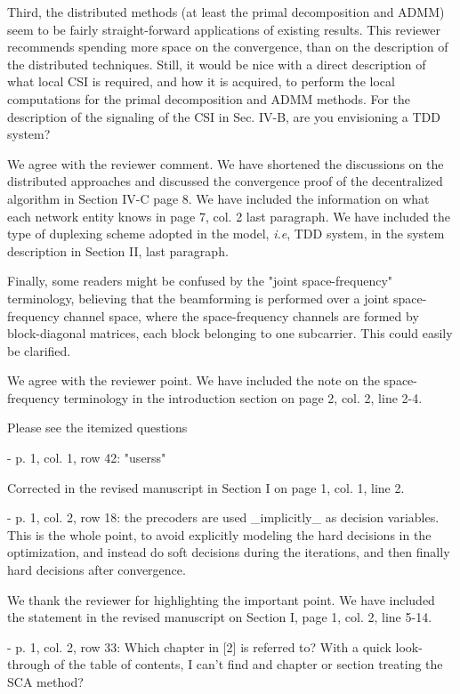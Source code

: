 \begin{itemize}
 Third, the distributed methods (at least the primal decomposition and ADMM) seem to be fairly straight-forward applications of existing results. This reviewer recommends spending more space on the convergence, than on the description of the distributed techniques. Still, it would be nice with a direct description of what local CSI is required, and how it is acquired, to perform the local computations for the primal decomposition and ADMM methods. For the description of the signaling of the CSI in Sec. IV-B, are you envisioning a TDD system?

\resp We agree with the reviewer comment. We have shortened the discussions on the distributed approaches and discussed the convergence proof of the decentralized algorithm in Section IV-C page 8. We have included the information on what each network entity knows in page 7, col. 2 last paragraph. We have included the type of duplexing scheme adopted in the model, \textit{i.e}, TDD system, in the system description in Section II, last paragraph.

 Finally, some readers might be confused by the "joint space-frequency" terminology, believing that the beamforming is performed over a joint space-frequency channel space, where the space-frequency channels are formed by block-diagonal matrices, each block belonging to one subcarrier. This could easily be clarified. 

\resp We agree with the reviewer point. We have included the note on the space-frequency terminology in the introduction section on page 2, col. 2, line 2-4.

 Please see the itemized questions

\begin{itemize}

 - p. 1, col. 1, row 42: "userss"

\resp Corrected in the revised manuscript in Section I on page 1, col. 1, line 2.

 - p. 1, col. 2, row 18: the precoders are used \_implicitly\_ as decision variables. This is the whole point, to avoid explicitly modeling the hard decisions in the optimization, and instead do soft decisions during the iterations, and then finally hard decisions after convergence.

\resp We thank the reviewer for highlighting the important point. We have included the statement in the revised manuscript on Section I, page 1, col. 2, line 5-14.

 - p. 1, col. 2, row 33: Which chapter in [2] is referred to? With a quick look-through of the table of contents, I can't find and chapter or section treating the SCA method?


\end{itemize}
\end{itemize}
